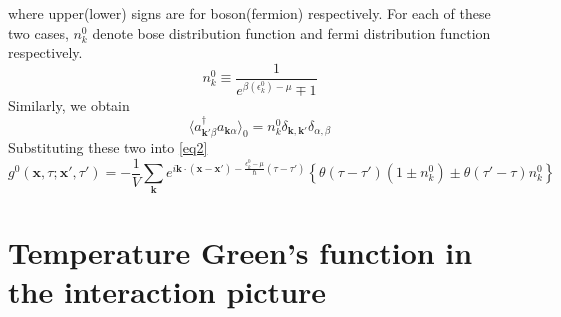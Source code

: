 where upper(lower) signs are for boson(fermion) respectively.
For each of these two cases, $n_{k}^{0}$ denote bose distribution function and fermi distribution function respectively.
$$
n_{k}^{0}\equiv\frac{1}{e^{\beta(\epsilon_{k}^{0})-\mu}\mp1}
$$
Similarly, we obtain
\[
\langle a_{\mathbf{k'}\beta}^{\dagger} a_{\mathbf{k}\alpha} \rangle_{0}=n_{k}^{0}\delta_{\mathbf{k},\mathbf{k'}}\delta_{\alpha,\beta} \tag{$4.1.24^\prime$}
\]
Substituting these two into \ref{eq2}
\begin{equation}\label{4.1.C}
g^{0}(\mathbf{x},\tau;\mathbf{x'},\tau')=-\frac{1}{V}\sum_{\mathbf{k}}e^{i\mathbf{k}\cdotp(\mathbf{x}-\mathbf{x'})-\frac{\epsilon_{k}^{0}-\mu}{\hbar}(\tau-\tau')}
\left\{\theta(\tau-\tau')(1\pm n_{k}^{0})\pm\theta(\tau'-\tau)n_{k}^{0}\right\}
\end{equation}


\section{Temperature Green's function in the interaction picture}

